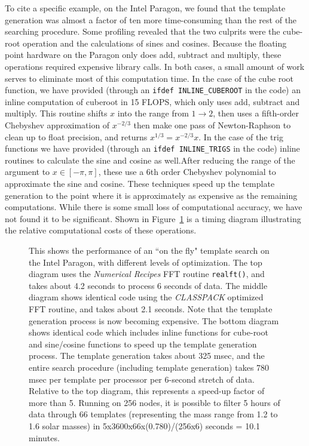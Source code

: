 To cite a specific example, on the Intel Paragon, we found that the
template generation was almost a factor of ten more time-consuming than
the rest of the searching procedure.  Some profiling revealed that the
two culprits were the cube-root operation and the calculations of sines
and cosines.  Because the floating point hardware on the Paragon only
does add, subtract and multiply, these operations required expensive
library calls.  In both cases, a small amount of work serves to eliminate
most of this computation time.  In the case of the cube root function,
we have provided (through an {\tt ifdef INLINE\_CUBEROOT} in the code)
an inline computation of cuberoot in 15 FLOPS, which only uses add,
subtract and multiply.  This routine shifts $x$ into the range from
$1\rightarrow 2$, then uses a fifth-order Chebyshev approximation of
$x^{-2/3}$ then make one pass of Newton-Raphson to clean up to float
precision, and returns $x^{1/3} = x^{-2/3} x$.  In the case of the trig
functions we have provided (through an {\tt ifdef INLINE\_TRIGS} in the
code) inline routines to calculate the sine and cosine as well.After
reducing the range of the argument to $x\in [-\pi,\pi]$, these use
a 6th order Chebyshev polynomial to approximate the sine and cosine.
These techniques speed up the template generation to the point where it
is approximately as expensive as the remaining computations.  While there
is some small loss of computational accuracy, we have not found it to
be significant.  Shown in Figure~\ref{f:paragon} is a timing
diagram illustrating the relative computational costs of these operations.
\begin{figure}
\vskip -0.9in
\vfill
{}
\vfill
{}
\vfill
\caption{\label{f:paragon} 
This shows the performance of an ``on the fly" template search on the
Intel Paragon, with different levels of optimization.  The top diagram
uses the {\it Numerical Recipes} FFT routine {\tt realft()}, and takes
about 4.2 seconds to process 6 seconds of data.  The middle diagram
shows identical code using the {\it CLASSPACK} optimized FFT routine,
and takes about 2.1 seconds.  Note that the template generation process
is now becoming expensive.  The bottom diagram shows identical code which
includes inline functions for cube-root and sine/cosine functions to speed
up the template generation process. The template generation takes about
325 msec, and the entire search procedure (including template generation)
takes 780 msec per template per processor per 6-second stretch of data.
Relative to the top diagram, this represents a speed-up factor of more
than 5.  Running on 256 nodes, it is possible to filter 5 hours of data
through 66 templates (representing the mass range from 1.2 to 1.6 solar
masses) in 5x3600x66x(0.780)/(256x6) seconds = 10.1 minutes.
}
\vskip -1.0in
\end{figure}


